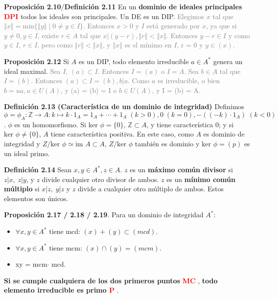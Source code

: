 \documentclass[a4paper, 11pt]{extarticle}
\newcommand{\propo}[1]{\textcolor{rojo}{\textbf{Proposición #1}}}
\newcommand{\defi}[1]{\textcolor{azul}{\textbf{Definición #1}}}
\begin{document}
\begin{multicols*}{2}
\propo{2.10}/\defi{2.11} En un \textbf{dominio de ideales principales \textcolor{red}{DPI}}
todos los ideales son principales. Un DE es un DIP. 
\textcolor{gray}{\footnotesize Elegimos \( x \) tal que \( \left\Vert x \right\Vert = \text{min}\{ \left\Vert y \right\Vert  \;|\; 0 \neq y \in I  \} \). 
Entonces \( x > 0 \) y \( I  \) está generado por \( x \), ya que si \( y \neq 0, y \in I  \),
existe \( r \in A \) tal que \( x|(y-r), \left\Vert r \right\Vert < \left\Vert x \right\Vert  \). Entonces \( y-r \in I  \) y como \( y \in I  \),
\( r \in I \), pero como \( \left\Vert r \right\Vert < \left\Vert x \right\Vert  \), y \( \left\Vert x \right\Vert  \) es el mínimo en \( I  \), r = 0 y \( y \in (x) \).}

\propo{2.12} Si \(A\) es un DIP, todo elemento irreducible \(a \in A^*\)
genera un ideal maximal. 
\textcolor{gray}{\footnotesize Sea \( I  \), \( (a) \subset I  \). Entonces \( I = (a) \) o 
\( I = A \). Sea \( b \in A \) tal que \( I = (b) \). Entonces \( (a) \subset I = (b), b | a \). 
Como \( a \) es irreducible, o bien \( b = ua, u \in U(A) \), y (a) = (b) = I \) o \( b \in U(A) \), y I = (b) = A.}

\defi{2.13 (Característica de un dominio de integridad)} Definimos \(\phi =
\phi_A: \mathbb{Z} \rightarrow A: k \mapsto k\cdot 1_A = 1_A + \cdots + 1_A\; (k >
0), 0\; (k = 0), -((-k) \cdot 1_A)\; (k < 0)\). \(\phi\) es un homomorfismo.
Si \(\text{ker }\phi = \{ 0 \}\), \(\mathbb{Z} \subset A\), y tiene
característica 0; y si \(\text{ker }\phi \neq \{ 0 \}\), \(A\) tiene
característica positiva. En este caso, como \(A\) es dominio de integridad y
\(Z/\text{ker }\phi \simeq \text{im } A \subset A\), \(Z/\text{ker } \phi\)
también es dominio y \(\text{ker }\phi = (p)\) es un ideal primo.

\defi{2.14} Sean \(x,y \in A^*, z \in A\). \(z\) es un \textbf{máximo común divisor}
si \(z|x, \; z|y\), y \(z\) divide cualquier otro divisor de ambos. 
\(z\) es un \textbf{mínimo común múltiplo} si \(x|z, \; y|z\) y \(z\) divide a
cualquier otro múltiplo de ambos. Estos elementos son únicos.

\propo{2.17 / 2.18 / 2.19}. Para un dominio de integridad \(A^*\): \vspace{-1em}
\begin{itemize}
\item \(\forall x,y \in A^*\) tiene mcd: \((x) + (y) \subset (mcd)\).
\item \(\forall x,y \in A^*\) tiene mcm: \((x) \cap (y) = (mcm)\).
\item xy = mcm\(\cdot\) mcd.
\end{itemize}
\textbf{Si se cumple cualquiera de los dos primeros puntos} \textbf{\textcolor{red}{MC}} , 
\textbf{todo elemento irreducible es primo \textcolor{red}{P}} . 


\end{multicols*}
\end{document}
